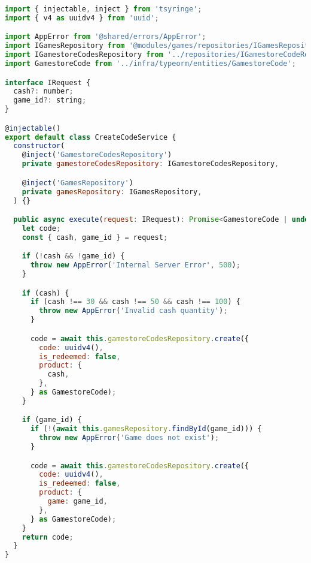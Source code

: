 \begin{lstlisting}[language=JavaScript, caption={CreateCodeService.ts},captionpos=b, label=alg:createcodeservice]
import { injectable, inject } from 'tsyringe';
import { v4 as uuidv4 } from 'uuid';

import AppError from '@shared/errors/AppError';
import IGamesRepository from '@modules/games/repositories/IGamesRepository';
import IGamestoreCodesRepository from '../repositories/IGamestoreCodeRepository';
import GamestoreCode from '../infra/typeorm/entities/GamestoreCode';

interface IRequest {
  cash?: number;
  game_id?: string;
}

@injectable()
export default class CreateCodeService {
  constructor(
    @inject('GamestoreCodesRepository')
    private gamestoreCodesRepository: IGamestoreCodesRepository,

    @inject('GamesRepository')
    private gamesRepository: IGamesRepository,
  ) {}

  public async execute(request: IRequest): Promise<GamestoreCode | undefined> {
    let code;
    const { cash, game_id } = request;

    if (!cash && !game_id) {
      throw new AppError('Internal Server Error', 500);
    }

    if (cash) {
      if (cash !== 30 && cash !== 50 && cash !== 100) {
        throw new AppError('Invalid cash quantity');
      }

      code = await this.gamestoreCodesRepository.create({
        code: uuidv4(),
        is_redeemed: false,
        product: {
          cash,
        },
      } as GamestoreCode);
    }

    if (game_id) {
      if (!(await this.gamesRepository.findById(game_id))) {
        throw new AppError('Game does not exist');
      }

      code = await this.gamestoreCodesRepository.create({
        code: uuidv4(),
        is_redeemed: false,
        product: {
          game: game_id,
        },
      } as GamestoreCode);
    }
    return code;
  }
}

\end{lstlisting}